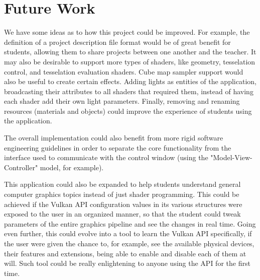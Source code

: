 \chapter{Future Work}
We have some ideas as to how this project could be improved. For example, the definition of a project description file format would be of great benefit for students, allowing them to share projects between one another and the teacher. It may also be desirable to support more types of shaders, like geometry, tesselation control, and tesselation evaluation shaders. Cube map sampler support would also be useful to create certain effects. Adding lights as entities of the application, broadcasting their attributes to all shaders that required them, instead of having each shader add their own light parameters. Finally, removing and renaming resources (materials and objects) could improve the experience of students using the application.

The overall implementation could also benefit from more rigid software engineering guidelines in order to separate the core functionality from the interface used to communicate with the control window (using the "Model-View-Controller" model, for example).

This application could also be expanded to help students understand general computer graphics topics instead of just shader programming. This could be achieved if the Vulkan API configuration values in its various structures were exposed to the user in an organized manner, so that the student could tweak parameters of the entire graphics pipeline and see the changes in real time. Going even further, this could evolve into a tool to learn the Vulkan API specifically, if the user were given the chance to, for example, see the available physical devices, their features and extensions, being able to enable and disable each of them at will. Such tool could be really enlightening to anyone using the API for the first time.
